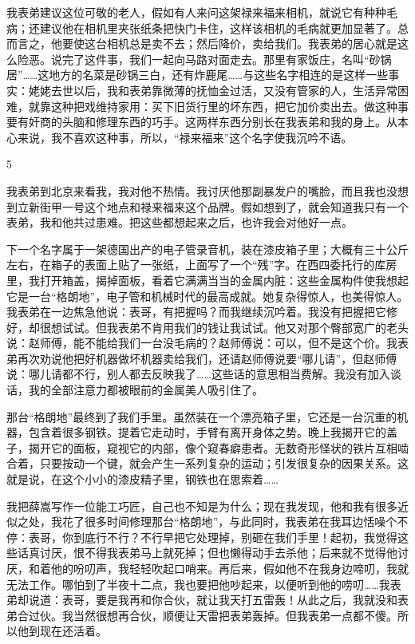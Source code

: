 我表弟建议这位可敬的老人，假如有人来问这架禄来福来相机，就说它有种种毛病；还建议他在相机里夹张纸条把快门卡住，这样该相机的毛病就更加显著了。总而言之，他要使这台相机总是卖不去；然后降价，卖给我们。我表弟的居心就是这么险恶。说完了这件事，我们一起向马路对面走去。那里有家饭庄，名叫“砂锅居”……这地方的名菜是砂锅三白，还有炸鹿尾……与这些名字相连的是这样一些事实：姥姥去世以后，我和表弟靠微薄的抚恤金过活，又没有管家的人，生活异常困难，就靠这种把戏维持家用：买下旧货行里的坏东西，把它加价卖出去。做这种事要有奸商的头脑和修理东西的巧手。这两样东西分别长在我表弟和我的身上。从本心来说，我不喜欢这种事，所以，“禄来福来”这个名字使我沉吟不语。 

5 

我表弟到北京来看我，我对他不热情。我讨厌他那副暴发户的嘴脸，而且我也没想到立新街甲一号这个地点和禄来福来这个品牌。假如想到了，就会知道我只有一个表弟，我和他共过患难。把这些都想起来之后，也许我会对他好一点。 

下一个名字属于一架德国出产的电子管录音机，装在漆皮箱子里；大概有三十公斤左右，在箱子的表面上贴了一张纸，上面写了一个“残”字。在西四委托行的库房里，我打开箱盖，揭掉面板，看着它满满当当的金属内脏：这些金属构件使我想起它是一台“格朗地”，电子管和机械时代的最高成就。她复杂得惊人，也美得惊人。我表弟在一边焦急他说：表哥，有把握吗？而我继续沉吟着。我没有把握把它修好，却很想试试。但我表弟不肯用我们的钱让我试试。他又对那个臀部宽广的老头说：赵师傅，能不能给我们一台没毛病的？赵师傅说：可以，但不是这个价。我表弟再次劝说他把好机器做坏机器卖给我们，还请赵师傅说要“哪儿请”，但赵师傅说：哪儿请都不行，别人都去反映我了……这些话的意思相当费解。我没有加入谈话，我的全部注意力都被眼前的金属美人吸引住了。 

那台“格朗地”最终到了我们手里。虽然装在一个漂亮箱子里，它还是一台沉重的机器，包含着很多钢铁。提着它走动时，手臂有离开身体之势。晚上我揭开它的盖子，揭开它的面板，窥视它的内部，像个窥春癖患者。无数奇形怪状的铁片互相啮合着，只要按动一个键，就会产生一系列复杂的运动；引发很复杂的因果关系。这就是说，在这个小小的漆皮精子里，钢铁也在思索着…… 

我把薛嵩写作一位能工巧匠，自己也不知是为什么；现在我发现，他和我有很多近似之处，我花了很多时间修理那台“格朗地”，与此同时，我表弟在我耳边恬噪个不停：表哥，你到底行不行？不行早把它处理掉，别砸在我们手里！起初，我觉得这些话真讨厌，恨不得我表弟马上就死掉；但也懒得动手去杀他；后来就不觉得他讨厌，和着他的吩叨声，我轻轻吹起口哨来。再后来，假如他不在我身边啼叨，我就无法工作。哪怕到了半夜十二点，我也要把他吵起来，以便听到他的唠叨……我表弟却说道：表哥，要是我再和你合伙，就让我天打五雷轰！从此之后，我就没和表弟合过伙。我当然很想再合伙，顺便让天雷把表弟轰掉。但我表弟一点都不傻。所以他到现在还活着。 

